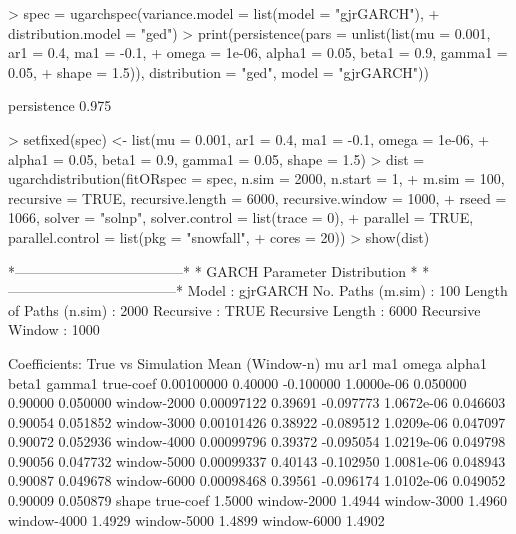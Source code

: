 \begin{Schunk}
\begin{Sinput}
> spec = ugarchspec(variance.model = list(model = "gjrGARCH"),
+     distribution.model = "ged")
> print(persistence(pars = unlist(list(mu = 0.001, ar1 = 0.4, ma1 = -0.1,
+     omega = 1e-06, alpha1 = 0.05, beta1 = 0.9, gamma1 = 0.05,
+     shape = 1.5)), distribution = "ged", model = "gjrGARCH"))
\end{Sinput}
\begin{Soutput}
persistence
      0.975
\end{Soutput}
\begin{Sinput}
> setfixed(spec) <- list(mu = 0.001, ar1 = 0.4, ma1 = -0.1, omega = 1e-06,
+     alpha1 = 0.05, beta1 = 0.9, gamma1 = 0.05, shape = 1.5)
> dist = ugarchdistribution(fitORspec = spec, n.sim = 2000, n.start = 1,
+     m.sim = 100, recursive = TRUE, recursive.length = 6000, recursive.window = 1000,
+     rseed = 1066, solver = "solnp", solver.control = list(trace = 0),
+     parallel = TRUE, parallel.control = list(pkg = "snowfall",
+         cores = 20))
> show(dist)
\end{Sinput}
\begin{Soutput}
*------------------------------------*
*    GARCH Parameter Distribution    *
*------------------------------------*
Model : gjrGARCH
No. Paths (m.sim) : 100
Length of Paths (n.sim) : 2000
Recursive : TRUE
Recursive Length : 6000
Recursive Window : 1000

Coefficients: True vs Simulation Mean (Window-n)
                    mu     ar1       ma1      omega   alpha1   beta1   gamma1
true-coef   0.00100000 0.40000 -0.100000 1.0000e-06 0.050000 0.90000 0.050000
window-2000 0.00097122 0.39691 -0.097773 1.0672e-06 0.046603 0.90054 0.051852
window-3000 0.00101426 0.38922 -0.089512 1.0209e-06 0.047097 0.90072 0.052936
window-4000 0.00099796 0.39372 -0.095054 1.0219e-06 0.049798 0.90056 0.047732
window-5000 0.00099337 0.40143 -0.102950 1.0081e-06 0.048943 0.90087 0.049678
window-6000 0.00098468 0.39561 -0.096174 1.0102e-06 0.049052 0.90009 0.050879
             shape
true-coef   1.5000
window-2000 1.4944
window-3000 1.4960
window-4000 1.4929
window-5000 1.4899
window-6000 1.4902
\end{Soutput}
\end{Schunk}

